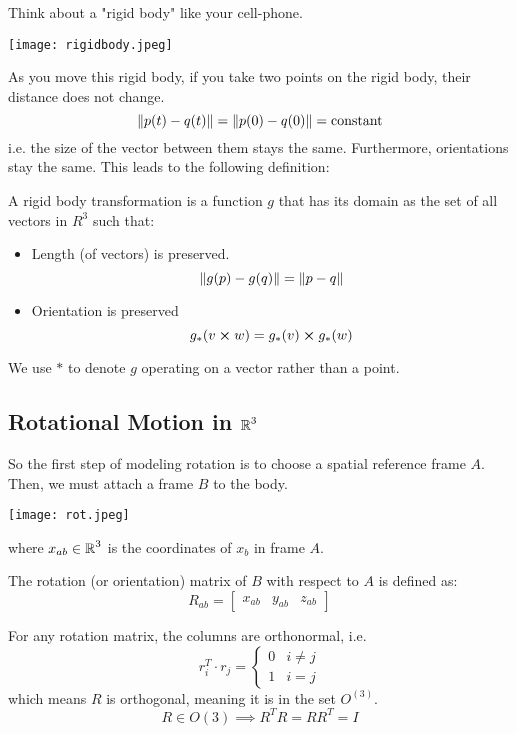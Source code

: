Think about a "rigid body" like your cell-phone.

\texttt{[image: rigidbody.jpeg]}

As you move this rigid body,
if you take two points on the rigid body, their distance does not change.
\[ \norm{p(t) - q(t)} = \norm{p(0) - q(0)} = \text{constant}\]
i.e. the size of the vector between them stays the same. Furthermore, orientations stay the same. This leads to the following definition:

\begin{definition}
    A rigid body transformation is a function $g$ that has its domain as the set of all
    vectors in $R^3$ such that:
    \begin{itemize}
        \item Length (of vectors) is preserved.
        \[ \norm{g(p) - g(q) } = \norm{p - q} \]
        \item Orientation is preserved
        \[ g_{*}(v \cross w) = g_{*}(v) \cross g_{*}(w) \]
    \end{itemize}
    We use $*$ to denote $g$ operating on a vector rather than a point.
\end{definition}

\subsection{Rotational Motion in $\operatorname{\mathbb{R}}^3$}

So the first step of modeling rotation is to choose a spatial reference frame $A$.
Then, we must attach a frame $B$ to the body.

\texttt{[image: rot.jpeg]}

where $x_{ab} \in \operatorname{\mathbb{R}}^3$ is the coordinates of $x_b$ in frame $A$.
\begin{definition}
    The rotation (or orientation) matrix of $B$ with respect to $A$ is defined as:
    \[ R_{ab} = \begin{bmatrix}
        x_{ab} & y_{ab} & z_{ab}
    \end{bmatrix} \]
\end{definition}

For any rotation matrix, the columns are orthonormal, i.e.
\[ r_i^T \cdot r_j = \begin{cases}
    0 & i \neq j \\
    1 & i = j
\end{cases} \]
which means $R$ is orthogonal, meaning it is in the set $O^{(3)}$.
\[ R \in O(3) \implies R^{T} R = R R^{T} = I \]

